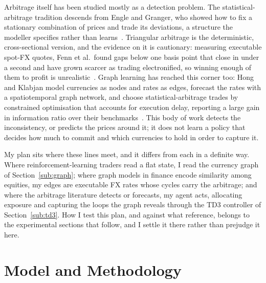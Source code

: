 \documentclass[12pt,a4paper]{article}
\begin{document}
Arbitrage itself has been studied mostly as a detection problem. The statistical-arbitrage
tradition descends from Engle and Granger, who showed how to fix a stationary combination of
prices and trade its deviations, a structure the modeller specifies rather than
learns~\citep{engle1987cointegration}. Triangular arbitrage is the deterministic,
cross-sectional version, and the evidence on it is cautionary: measuring executable spot-FX
quotes, Fenn et al.\ found gaps below one basis point that close in under a second and have
grown scarcer as trading electronified, so winning enough of them to profit is
unrealistic~\citep{fenn2009mirage}. Graph learning has reached this corner too: Hong and
Klabjan model currencies as nodes and rates as edges, forecast the rates with a
spatiotemporal graph network, and choose statistical-arbitrage trades by constrained
optimisation that accounts for execution delay, reporting a large gain in information ratio
over their benchmarks~\citep{hong2025graphfx}. This body of work detects the inconsistency, or
predicts the prices around it; it does not learn a policy that decides how much to commit and
which currencies to hold in order to capture it.

My plan sits where these lines meet, and it differs from each in a definite way. Where
reinforcement-learning traders read a flat state, I read the currency graph of
Section~\ref{sub:graph}; where graph models in finance encode similarity among equities, my
edges are executable FX rates whose cycles carry the arbitrage; and where the arbitrage
literature detects or forecasts, my agent acts, allocating exposure and capturing the loops
the graph reveals through the TD3 controller of Section~\ref{sub:td3}. How I test this
plan, and against what reference, belongs to the experimental sections that follow, and I
settle it there rather than prejudge it here.

\section{Model and Methodology}
\label{sec:model}
\end{document}
